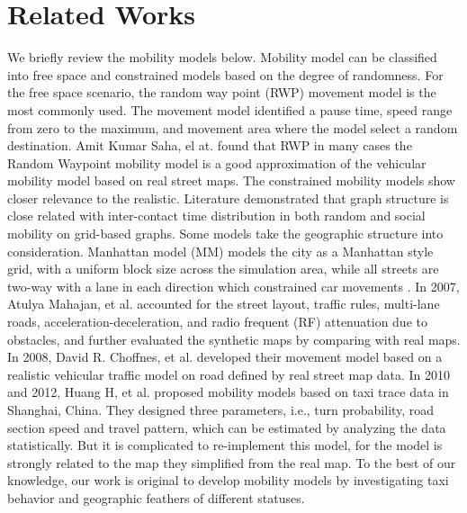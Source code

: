 \section{Related Works}
\label{section_related_works}

We briefly review the mobility models below.
Mobility model can be classified into free space and constrained models\cite{LuChen-104,AhmedKarmakar-106} based on the degree of randomness.
For the free space scenario, the random way point (RWP)\cite{broch1998performance} movement model is the most commonly used. The movement model identified a pause time, speed range from zero to the maximum, and movement area where the model select a random destination. Amit Kumar Saha, el at. \cite{SahaJohnson-91} found that RWP in many cases the Random Waypoint mobility model is a good approximation of the vehicular mobility model based on real street maps.
The constrained mobility models show closer relevance to the realistic. Literature \cite{MayerWaldhorst-108} demonstrated that graph structure is close related with inter-contact time distribution in both random and social mobility on grid-based graphs. Some models \cite{SahaJohnson-91,PengDong-101,HuangZhu-88,MartinezCano-87,ChoffnesBustamante-93} take the geographic structure into consideration. Manhattan model (MM) models the city as a Manhattan style grid, with a uniform block size across the simulation area, while all streets are two-way with a lane in each direction which constrained car movements \cite{MartinezCano-87}. In 2007, Atulya Mahajan, et al. \cite{MahajanPotnis-102} accounted for the street layout, traffic rules, multi-lane roads, acceleration-deceleration, and radio frequent (RF) attenuation due to obstacles, and further evaluated the synthetic maps by comparing with real maps. In 2008, David R. Choffnes, et al.\cite{ChoffnesBustamante-93} developed their movement model based on a realistic vehicular traffic model on road defined by real street map data.
In 2010 and 2012, Huang H, et al. \cite{HuangZhu-88,HuangZhang-105} proposed mobility models based on taxi trace data in Shanghai, China. They designed three parameters, i.e., turn probability, road section speed and travel pattern, which can be estimated by analyzing the data statistically. But it is complicated to re-implement this model, for the model is strongly related to the map they simplified from the real map.
To the best of our knowledge, our work is original to develop mobility models by investigating taxi behavior and geographic feathers of different statuses.


